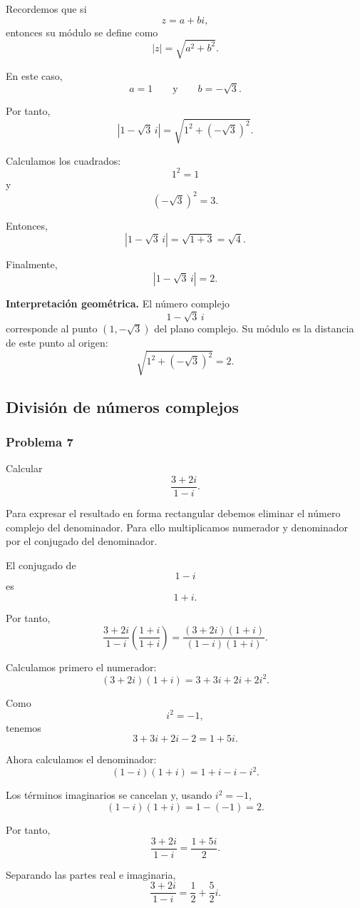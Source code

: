 Recordemos que si
\[
z=a+bi,
\]
entonces su módulo se define como
\[
|z|=\sqrt{a^2+b^2}.
\]

En este caso,
\[
a=1
\qquad\text{y}\qquad
b=-\sqrt3.
\]

Por tanto,
\[
\left|1-\sqrt3\,i\right|
=
\sqrt{1^2+(-\sqrt3)^2}.
\]

Calculamos los cuadrados:
\[
1^2=1
\]
y
\[
(-\sqrt3)^2=3.
\]

Entonces,
\[
\left|1-\sqrt3\,i\right|
=
\sqrt{1+3}
=
\sqrt4.
\]

Finalmente,
\[
\boxed{
\left|1-\sqrt3\,i\right|=2
}.
\]

\medskip

\noindent
\textbf{Interpretación geométrica.}
El número complejo
\[
1-\sqrt3\,i
\]
corresponde al punto $(1,-\sqrt3)$ del plano complejo. Su módulo es la
distancia de este punto al origen:
\[
\sqrt{1^2+(-\sqrt3)^2}=2.
\]

\subsection{División de números complejos}

\subsubsection*{Problema 7}

Calcular
\[
\frac{3+2i}{1-i}.
\]

Para expresar el resultado en forma rectangular debemos eliminar el número
complejo del denominador. Para ello multiplicamos numerador y denominador
por el conjugado del denominador.

El conjugado de
\[
1-i
\]
es
\[
1+i.
\]

Por tanto,
\[
\frac{3+2i}{1-i}
\left(\frac{1+i}{1+i}\right)
=
\frac{(3+2i)(1+i)}{(1-i)(1+i)}.
\]

Calculamos primero el numerador:
\[
(3+2i)(1+i)
=
3+3i+2i+2i^2.
\]

Como
\[
i^2=-1,
\]
tenemos
\[
3+3i+2i-2
=
1+5i.
\]

Ahora calculamos el denominador:
\[
(1-i)(1+i)
=
1+i-i-i^2.
\]

Los términos imaginarios se cancelan y, usando $i^2=-1$,
\[
(1-i)(1+i)
=
1-(-1)
=
2.
\]

Por tanto,
\[
\frac{3+2i}{1-i}
=
\frac{1+5i}{2}.
\]

Separando las partes real e imaginaria,
\[
\boxed{
\frac{3+2i}{1-i}
=
\frac12+\frac52i
}.
\]

